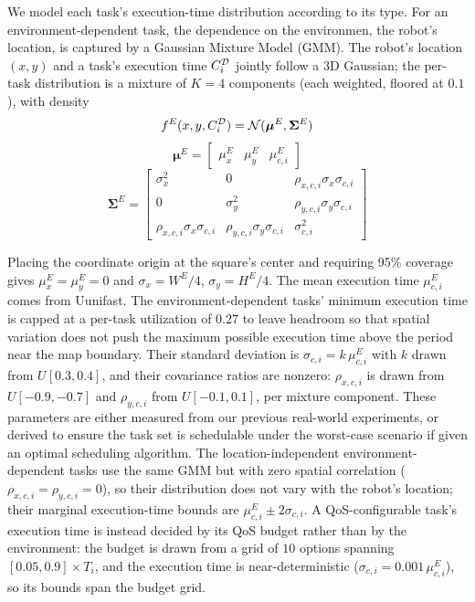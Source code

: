 We model each task's execution-time distribution according to its type.
For an environment-dependent task, the dependence on the environmen, \ie the robot's location, is captured by a
Gaussian Mixture Model (GMM).
The robot's location $(x, y)$ and a task's execution time $C_{i}^{\mathcal{D}}$ jointly follow a 3D Gaussian;
the per-task distribution is a mixture of $K{=}4$ components (each weighted, floored at $0.1$), with density
\begin{equation}
    f^{E}(x, y, C_{i}^{\mathcal{D}}) =\mathcal{N}(\boldsymbol{\mu}^E, \boldsymbol{\Sigma}^E)
    \label{eq: pdf_gmm}
\end{equation}
\begin{equation}
    \boldsymbol{\mu}^E = \begin{bmatrix}
        \mu^E_x & \mu^E_y & \mu^E_{c,i}
    \end{bmatrix}
\end{equation}
\begin{equation}
    \boldsymbol{\Sigma}^E =
    \begin{bmatrix}
        \sigma_x^2 & 0 & \rho_{x,c,i} \sigma_x \sigma_{c,i} \\
        0 & \sigma_y^2 & \rho_{y,c,i} \sigma_y \sigma_{c,i} \\
        \rho_{x,c,i} \sigma_x \sigma_{c,i} & \rho_{y,c,i} \sigma_y \sigma_{c,i} & \sigma_{c,i}^2
    \end{bmatrix}
\end{equation}

Placing the coordinate origin at the square's center and requiring 95\% coverage gives
$\mu^E_x = \mu^E_y = 0$ and $\sigma_x = W^E/4$, $\sigma_y = H^E/4$.
The mean execution time $\mu^E_{c,i}$ comes from Uunifast.
The environment-dependent tasks' minimum execution time is capped at a per-task utilization of $0.27$ to leave headroom so that spatial
variation does not push the maximum possible execution time above the period near the map boundary.
Their standard deviation is $\sigma_{c,i} = k\,\mu^E_{c,i}$ with $k$ drawn from $U[0.3, 0.4]$, and their
covariance ratios are nonzero: $\rho_{x,c,i}$ is drawn from $U[-0.9, -0.7]$ and $\rho_{y,c,i}$ from
$U[-0.1, 0.1]$, per mixture component. 
These parameters are either measured from our previous real-world experiments, 
or derived to ensure the task set is schedulable under the worst-case scenario if given an optimal scheduling algorithm.
The location-independent environment-dependent tasks use the same GMM but with zero spatial correlation
($\rho_{x,c,i} = \rho_{y,c,i} = 0$), so their distribution does not vary with the robot's location;
their marginal execution-time bounds are $\mu^E_{c,i} \pm 2\sigma_{c,i}$.
A QoS-configurable task's execution time is instead decided by its QoS budget rather than by the
environment: the budget is drawn from a grid of $10$ options spanning $[0.05, 0.9] \times T_i$, and the
execution time is near-deterministic ($\sigma_{c,i} = 0.001\,\mu^E_{c,i}$), so its bounds span the
budget grid.

